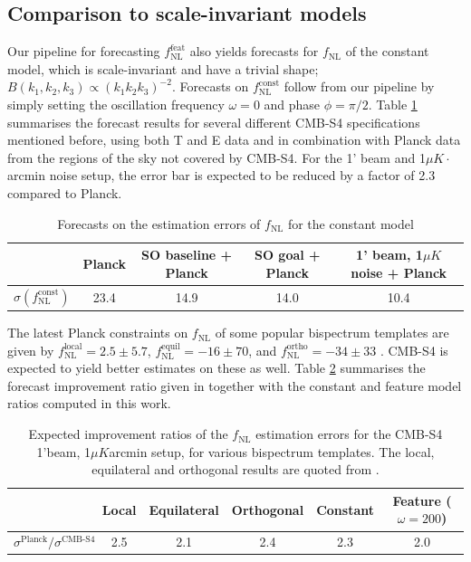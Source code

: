 \subsection{Comparison to scale-invariant models}

Our pipeline for forecasting $f_\text{NL}^\text{feat}$ also yields forecasts for $f_\text{NL}$ of the constant model, which is scale-invariant and have a trivial shape; $B(k_1,k_2,k_3) \propto (k_1 k_2 k_3)^{-2}$.
Forecasts on $f_\text{NL}^\text{const}$ follow from our pipeline by simply setting the oscillation frequency $\omega = 0$ and phase $\phi = \pi/2$. Table \ref{forecast constant model} summarises the forecast results for several different CMB-S4 specifications mentioned before, using both T and E data and in combination with Planck data from the regions of the sky not covered by CMB-S4. For the 1' beam and 1$\mu K \cdot$arcmin noise setup, the error bar is expected to be reduced by a factor of 2.3 compared to Planck.

\begin{table}[ht]
	\caption{Forecasts on the estimation errors of $f_\text{NL}$ for the constant model}
	\centering
	\label{forecast constant model}
	\renewcommand{\arraystretch}{1.4}
	\begin{tabular}{ccccc}
		\toprule
		& Planck  & SO baseline + Planck & SO goal + Planck & 1' beam, 1$\mu K$ noise + Planck \\
		\midrule
		$\sigma(f_\text{NL}^\text{const})$ & 23.4 & 14.9 & 14.0 & 10.4 \\
		\bottomrule
	\end{tabular}
\end{table}

The latest Planck constraints on $f_\text{NL}$ of some popular bispectrum templates are given by $f_\text{NL}^\text{local} = 2.5 \pm 5.7$, $f_\text{NL}^\text{equil} = -16 \pm 70$, and $f_\text{NL}^\text{ortho} = -34 \pm 33$ \cite{PlanckCollaboration2015}. CMB-S4 is expected to yield better estimates on these as well. Table \ref{forecast various models} summarises the forecast improvement ratio given in \cite{Abazajian2016} together with the constant and feature model ratios computed in this work.

\begin{table}[ht]
	\caption{Expected improvement ratios of the $f_\text{NL}$ estimation errors for the CMB-S4 1'beam, 1$\mu K$arcmin setup, for various bispectrum templates. The local, equilateral and orthogonal results are quoted from \cite{Abazajian2016}.}
	\centering	
	\label{forecast various models}
	\renewcommand{\arraystretch}{1.4}
	\begin{tabular}{cccccc}
		\toprule
		& Local & Equilateral & Orthogonal & Constant & Feature ($\omega=200$) \\ \midrule
		$\sigma^\text{Planck}/\sigma^\text{CMB-S4}$ & 2.5   & 2.1         & 2.4        & 2.3      & 2.0                \\
		\bottomrule
	\end{tabular}
	
\end{table}

